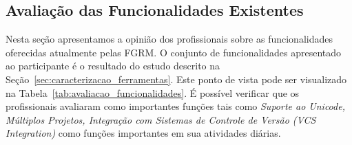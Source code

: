\subsection{Avaliação das Funcionalidades Existentes}
\label{sub:avaliação_das_funcionalidades_existentes}

Nesta seção apresentamos a opinião dos profissionais sobre as funcionalidades
oferecidas atualmente pelas FGRM\@. O conjunto de funcionalidades apresentado ao
participante é o resultado do estudo descrito na
Seção~\ref{sec:caracterizacao_ferramentas}. Este ponto de vista pode ser
visualizado na Tabela~\ref{tab:avaliacao_funcionalidades}. É possível verificar
que os profissionais avaliaram como importantes funções tais como
\textit{Suporte ao Unicode, Múltiplos Projetos, Integração com Sistemas de
	Controle de Versão (VCS Integration)} como  funções importantes em sua
atividades diárias.

